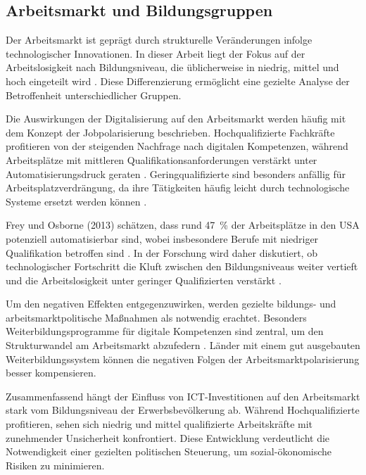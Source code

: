 
\subsection{Arbeitsmarkt und Bildungsgruppen}

Der Arbeitsmarkt ist geprägt durch strukturelle Veränderungen infolge technologischer 
Innovationen. In dieser Arbeit liegt der Fokus auf der Arbeitslosigkeit nach 
Bildungsniveau, die üblicherweise in niedrig, mittel und hoch eingeteilt wird 
\parencite[vgl.][S. 35–37]{frey2013thefuture}. Diese Differenzierung ermöglicht eine 
gezielte Analyse der Betroffenheit unterschiedlicher Gruppen.

Die Auswirkungen der Digitalisierung auf den Arbeitsmarkt werden häufig mit dem Konzept 
der Jobpolarisierung beschrieben. Hochqualifizierte Fachkräfte profitieren von der 
steigenden Nachfrage nach digitalen Kompetenzen, während Arbeitsplätze mit mittleren 
Qualifikationsanforderungen verstärkt unter Automatisierungsdruck geraten 
\parencite[vgl.][S. 40]{autor2015whyare}. Geringqualifizierte sind besonders anfällig für 
Arbeitsplatzverdrängung, da ihre Tätigkeiten häufig leicht durch technologische Systeme 
ersetzt werden können \parencite[vgl.][S. 10]{acemoglu2002technical}.

Frey und Osborne (2013) schätzen, dass rund 47~\% der Arbeitsplätze in den USA potenziell 
automatisierbar sind, wobei insbesondere Berufe mit niedriger Qualifikation betroffen sind 
\parencite[vgl.][S. 14–15]{frey2013thefuture}. In der Forschung wird daher diskutiert, ob 
technologischer Fortschritt die Kluft zwischen den Bildungsniveaus weiter vertieft und die 
Arbeitslosigkeit unter geringer Qualifizierten verstärkt 
\parencite[vgl.][S. 2–4]{balsmeier2019isthis}.

Um den negativen Effekten entgegenzuwirken, werden gezielte bildungs- und 
arbeitsmarktpolitische Maßnahmen als notwendig erachtet. Besonders Weiterbildungsprogramme 
für digitale Kompetenzen sind zentral, um den Strukturwandel am Arbeitsmarkt abzufedern 
\parencite[vgl.][S. 75]{brynjolfsson2014thesecond}. Länder mit einem gut ausgebauten 
Weiterbildungssystem können die negativen Folgen der Arbeitsmarktpolarisierung besser 
kompensieren.

Zusammenfassend hängt der Einfluss von \ac{ICT}-Investitionen auf den Arbeitsmarkt stark 
vom Bildungsniveau der Erwerbsbevölkerung ab. Während Hochqualifizierte profitieren, 
sehen sich niedrig und mittel qualifizierte Arbeitskräfte mit zunehmender Unsicherheit 
konfrontiert. Diese Entwicklung verdeutlicht die Notwendigkeit einer gezielten 
politischen Steuerung, um sozial-ökonomische Risiken zu minimieren.
